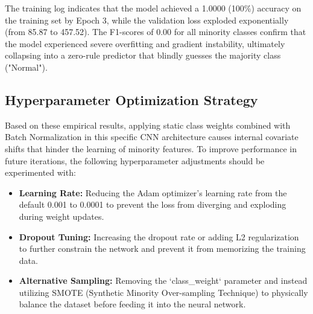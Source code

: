 \documentclass[10pt,a4paper,twocolumn]{article}
\begin{document}
The training log indicates that the model achieved a 1.0000 (100\%) accuracy on the training set by Epoch 3, while the validation loss exploded exponentially (from 85.87 to 457.52). The F1-scores of 0.00 for all minority classes confirm that the model experienced severe overfitting and gradient instability, ultimately collapsing into a zero-rule predictor that blindly guesses the majority class ("Normal").

\subsection{Hyperparameter Optimization Strategy}
Based on these empirical results, applying static class weights combined with Batch Normalization in this specific CNN architecture causes internal covariate shifts that hinder the learning of minority features. To improve performance in future iterations, the following hyperparameter adjustments should be experimented with:
\begin{itemize}
    \item \textbf{Learning Rate:} Reducing the Adam optimizer's learning rate from the default 0.001 to 0.0001 to prevent the loss from diverging and exploding during weight updates.
    \item \textbf{Dropout Tuning:} Increasing the dropout rate or adding L2 regularization to further constrain the network and prevent it from memorizing the training data.
    \item \textbf{Alternative Sampling:} Removing the `class\_weight` parameter and instead utilizing SMOTE (Synthetic Minority Over-sampling Technique) to physically balance the dataset before feeding it into the neural network.
\end{itemize}
\end{document}
